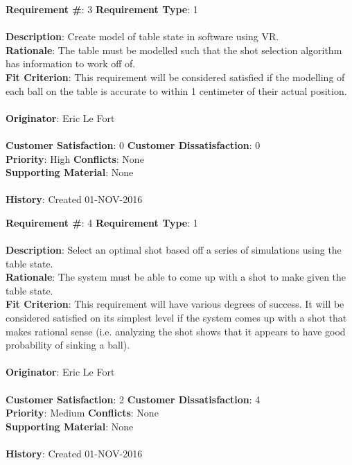 \documentclass[titlepage]{article}
\begin{document}
\begin{framed}
	\noindent\textbf{Requirement \#}: 3 \hfill \textbf{Requirement Type}: 1 \hfill\\\\
	\noindent\textbf{Description}: Create model of table state in software using VR.\\
	\textbf{Rationale}: The table must be modelled such that the shot selection algorithm has information to work off of.\\
	\textbf{Fit Criterion}: This requirement will be considered satisfied if the modelling of each ball on the table is accurate to within 1 centimeter of their actual position.\\\\
	\textbf{Originator}: Eric Le Fort\\\\
	\noindent\textbf{Customer Satisfaction}: 0 \hfill 	\textbf{Customer Dissatisfaction}: 0 \hfill\\
	\textbf{Priority}: High \hfill \textbf{Conflicts}: None \hfill\\
	\textbf{Supporting Material}: None\\\\
	\noindent\textbf{History}: Created 01-NOV-2016
\end{framed}

\begin{framed}
	\noindent\textbf{Requirement \#}: 4 \hfill \textbf{Requirement Type}: 1 \hfill\\\\
	\noindent\textbf{Description}: Select an optimal shot based off a series of simulations using the table state.\\
	\textbf{Rationale}: The system must be able to come up with a shot to make given the table state.\\
	\textbf{Fit Criterion}: This requirement will have various degrees of success. It will be considered satisfied on its simplest level if the system comes up with a shot that makes rational sense (i.e. analyzing the shot shows that it appears to have good probability of sinking a ball).\\\\
	\textbf{Originator}: Eric Le Fort\\\\
	\noindent\textbf{Customer Satisfaction}: 2 \hfill 	\textbf{Customer Dissatisfaction}: 4 \hfill\\
	\textbf{Priority}: Medium \hfill \textbf{Conflicts}: None \hfill\\
	\textbf{Supporting Material}: None\\\\
	\noindent\textbf{History}: Created 01-NOV-2016
\end{framed}
\end{document}
